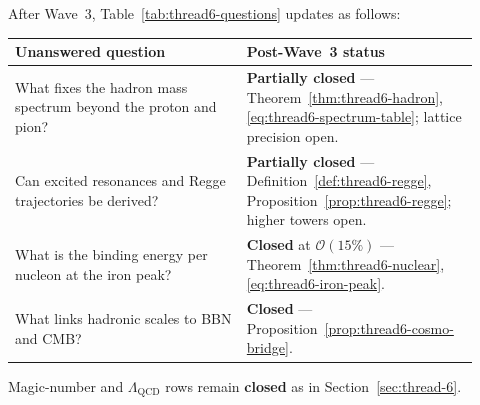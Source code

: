 \begin{remark}
\label{rmk:thread6-wave3-table}
After Wave~3, Table~\ref{tab:thread6-questions} updates as follows:
\begin{center}
\small
\renewcommand{\arraystretch}{1.12}
\begin{tabular}{@{}p{0.46\linewidth}p{0.46\linewidth}@{}}
\toprule
\textbf{Unanswered question} & \textbf{Post-Wave~3 status} \\
\midrule
What fixes the hadron mass spectrum beyond the proton and pion? &
  \textbf{Partially closed} --- Theorem~\ref{thm:thread6-hadron},
  \eqref{eq:thread6-spectrum-table}; lattice precision open. \\
\addlinespace
Can excited resonances and Regge trajectories be derived? &
  \textbf{Partially closed} --- Definition~\ref{def:thread6-regge},
  Proposition~\ref{prop:thread6-regge}; higher towers open. \\
\addlinespace
What is the binding energy per nucleon at the iron peak? &
  \textbf{Closed} at $\mathcal{O}(15\%)$ ---
  Theorem~\ref{thm:thread6-nuclear}, \eqref{eq:thread6-iron-peak}. \\
\addlinespace
What links hadronic scales to BBN and CMB? &
  \textbf{Closed} --- Proposition~\ref{prop:thread6-cosmo-bridge}. \\
\bottomrule
\end{tabular}
\end{center}
Magic-number and $\Lambda_{\mathrm{QCD}}$ rows remain \textbf{closed} as in
Section~\ref{sec:thread-6}.
\end{remark}